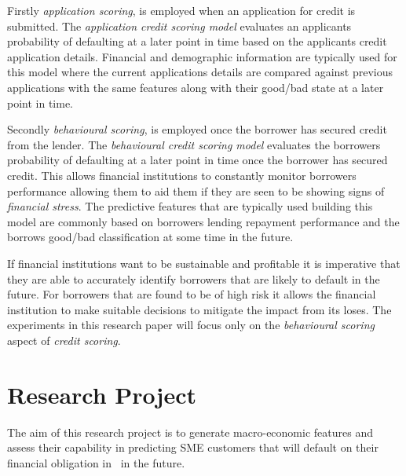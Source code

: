 Firstly \textit{application scoring}, is employed when an application for credit is submitted. The \textit{application credit scoring model} evaluates an applicants probability of defaulting at a later point in time based on the applicants credit application details. Financial and demographic information are typically used for this model where the current applications details are compared against previous applications with the same features along with their good/bad state at a later point in time.

Secondly \textit{behavioural scoring}, is employed once the borrower has secured credit from the lender. The \textit{behavioural credit scoring model} evaluates the borrowers probability of defaulting at a later point in time once the borrower has secured credit. This allows financial institutions to constantly monitor borrowers performance allowing them to aid them if they are seen to be showing signs of \textit{financial stress}. The predictive features that are typically used building this model are commonly based on borrowers lending repayment performance and the borrows good/bad classification at some time in the future. 

If financial institutions want to be sustainable and profitable it is imperative that they are able to accurately identify borrowers that are likely to default in the future. For borrowers that are found to be of high risk it allows the financial institution to make suitable decisions to mitigate the impact from its loses. The experiments in this research paper will focus only on the \textit{behavioural scoring} aspect of \textit{credit scoring}.


\section{Research Project}

The aim of this research project is to generate macro-economic features and assess their capability in predicting SME customers that will default on  their financial obligation in \subjectname\ in the future.



